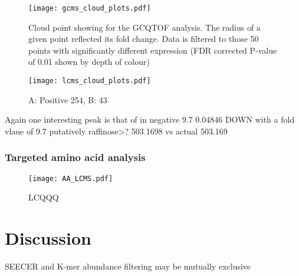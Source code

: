 

\begin{figure}
    \texttt{[image: gcms\_cloud\_plots.pdf]}
    \caption[GCQTOF Cloud Plot]{Cloud point showing for the GCQTOF analysis. 
    The radius of a given point reflected its fold change.
    Data is filtered to those 50 points with significantly 
different expression (FDR corrected P-value of 0.01 shown by 
depth of colour)}
    \label{fig:gcms_clouds}
\end{figure}

\begin{figure}
    \texttt{[image: lcms\_cloud\_plots.pdf]}
    \caption[LCQTOF Cloud Plots]{A: Positive 254,  B: 43}
    \label{fig:lcms_clouds}
\end{figure}


%


Again one interesting peak is that of 
in negative
9.7 0.04846 DOWN with a fold vlaue of 9.7
putatively raffinose>? 503.1698  vs actual 503.169
    

\subsubsection{Targeted amino acid analysis}



\begin{figure}
    \texttt{[image: AA\_LCMS.pdf]}
    \caption[LCQQQ Quantitative Analysis of Amino Acids]{LCQQQ}
    \label{fig:amino_acids}
\end{figure}









\section{Discussion}

SEECER and K-mer abundance filtering may be mutually exclusive

